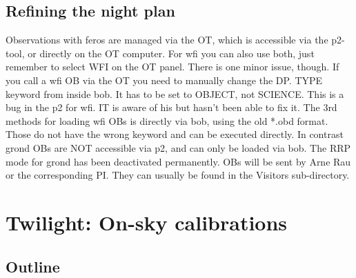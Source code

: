 \documentclass[11pt,fleqn,a4paper]{book}
\begin{document}
\section{Refining the night plan}

Observations with \gls{feros} are managed via the OT, which is accessible via the p2-tool, or directly on the OT computer.  For \gls{wfi} you can also use both, just remember to select WFI on the OT panel. There is one minor issue, though. If you call a  \gls{wfi} OB via the OT you need to manually change the DP. TYPE keyword from inside \gls{bob}. It has to be set to OBJECT, not SCIENCE. This is a bug in the p2 for \gls{wfi}. IT is aware of his but hasn't been able to fix it. The 3rd  methods for loading \gls{wfi} OBs is directly via bob, using the old *.obd format. Those do not have the wrong keyword and can be executed directly. In contrast \gls{grond} OBs are NOT accessible via p2, and can only be loaded via bob. The RRP mode for \gls{grond} has been deactivated permanently. OBs will be sent  by Arne Rau or the corresponding PI. They can usually be found in the Visitors sub-directory.



\chapter{Twilight: On-sky calibrations}
\label{chap:nightcal}


\section{Outline}
\end{document}

